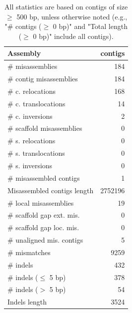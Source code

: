 \documentclass[12pt,a4paper]{article}
\begin{document}
\begin{table}[ht]
\begin{center}
\caption{All statistics are based on contigs of size $\geq$ 500 bp, unless otherwise noted (e.g., "\# contigs ($\geq$ 0 bp)" and "Total length ($\geq$ 0 bp)" include all contigs).}
\begin{tabular}{|l*{1}{|r}|}
\hline
Assembly & contigs \\ \hline
\# misassemblies & 184 \\ \hline
\hspace{2mm}\# contig misassemblies & 184 \\ \hline
\hspace{5mm}\# c. relocations & 168 \\ \hline
\hspace{5mm}\# c. translocations & 14 \\ \hline
\hspace{5mm}\# c. inversions & 2 \\ \hline
\hspace{2mm}\# scaffold misassemblies & 0 \\ \hline
\hspace{5mm}\# s. relocations & 0 \\ \hline
\hspace{5mm}\# s. translocations & 0 \\ \hline
\hspace{5mm}\# s. inversions & 0 \\ \hline
\# misassembled contigs & 1 \\ \hline
Misassembled contigs length & 2752196 \\ \hline
\# local misassemblies & 19 \\ \hline
\# scaffold gap ext. mis. & 0 \\ \hline
\# scaffold gap loc. mis. & 0 \\ \hline
\# unaligned mis. contigs & 5 \\ \hline
\# mismatches & 9259 \\ \hline
\# indels & 432 \\ \hline
\hspace{5mm}\# indels ($\leq$ 5 bp) & 378 \\ \hline
\hspace{5mm}\# indels ($>$ 5 bp) & 54 \\ \hline
Indels length & 3524 \\ \hline
\end{tabular}
\end{center}
\end{table}
\end{document}
